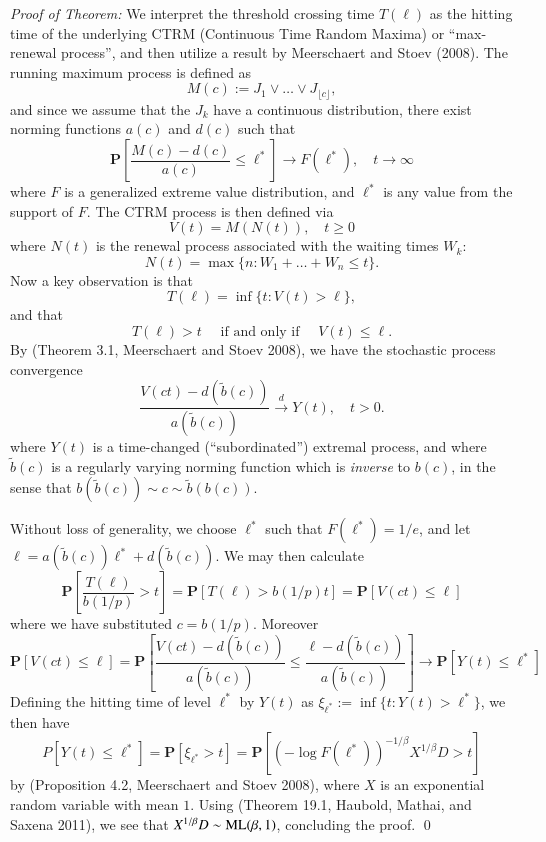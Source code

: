 \documentclass[]{elsarticle} %
\begin{document}
\emph{Proof of Theorem:} We interpret the threshold crossing time
\(T(\ell)\) as the hitting time of the underlying CTRM (Continuous Time
Random Maxima) or ``max-renewal process'', and then utilize a result by
Meerschaert and Stoev (2008). The running maximum process is defined as
\[
M(c) := J_1 \vee \ldots \vee J_{\lfloor c \rfloor},
\] and since we assume that the \(J_k\) have a continuous distribution,
there exist norming functions \(a(c)\) and \(d(c)\) such that \[
\mathbf P\left[ \frac{M(c) - d(c)}{a(c)} \le \ell^* \right] 
\longrightarrow F(\ell^*), \quad t \to \infty
\] where \(F\) is a generalized extreme value distribution, and
\(\ell^*\) is any value from the support of \(F\). The CTRM process is
then defined via \[
V(t) = M(N(t)), \quad t \ge 0
\] where \(N(t)\) is the renewal process associated with the waiting
times \(W_k\): \[
N(t) = \max\{n: W_1 + \ldots + W_n \le t\}.
\] Now a key observation is that \[
T(\ell) = \inf\{t: V(t) > \ell\}, 
\] and that \[
T(\ell) > t \quad \text{ if and only if } \quad V(t) \le \ell.
\] By (Theorem 3.1, Meerschaert and Stoev 2008), we have the stochastic
process convergence \[
\frac{V(ct) - d(\tilde b(c))}{a(\tilde b(c))} 
\stackrel{d}{\longrightarrow} Y(t), \quad t > 0.
\] where \(Y(t)\) is a time-changed (``subordinated'') extremal process,
and where \(\tilde b(c)\) is a regularly varying norming function which
is \emph{inverse} to \(b(c)\), in the sense that
\(b(\tilde b(c)) \sim c \sim \tilde b(b(c))\).

Without loss of generality, we choose \(\ell^*\) such that
\(F(\ell^*) = 1/e\), and let
\(\ell = a(\tilde b(c)) \ell^* + d(\tilde b(c))\). We may then calculate
\[
\mathbf P\left[ \frac{T(\ell)}{b(1/p)} > t \right]
= \mathbf P[T(\ell) > b(1/p) t]
= \mathbf P[V(ct) \le \ell]
\] where we have substituted \(c = b(1/p)\). Moreover \[
\mathbf P[V(ct) \le \ell]
= \mathbf P\left[ \frac{V(ct) - d(\tilde b(c))}{a(\tilde b(c))} 
\le \frac{\ell - d(\tilde b(c))}{a(\tilde b(c))} \right]
\longrightarrow \mathbf P\left[ Y(t) \le \ell^* \right]
\] Defining the hitting time of level \(\ell^*\) by \(Y(t)\) as
\(\xi_{\ell^*} := \inf\{t: Y(t) > \ell^*\}\), we then have \[
P\left[ Y(t) \le \ell^* \right] = \mathbf P[\xi_{\ell^*} > t] 
= \mathbf P[(-\log F(\ell^*))^{-1/\beta} X^{1/\beta} D > t]
\] by (Proposition 4.2, Meerschaert and Stoev 2008), where \(X\) is an
exponential random variable with mean \(1\). Using (Theorem 19.1,
Haubold, Mathai, and Saxena 2011), we see that
\(X^{1/\beta} D \sim {\rm ML}(\beta, 1)\), concluding the proof. \qed  
\end{document}
